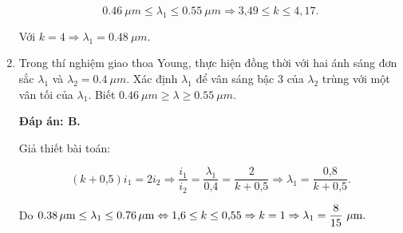 \begin{enumerate}[label=\bfseries Câu \arabic*:]
{		$$\SI{0,46}{\mu m} \leq \lambda_1 \leq \SI{0,55}{\mu m} \Rightarrow \text{3,49} \leq k \leq 4,17.$$
		
		Với $k = 4 \Rightarrow \lambda_1 = \SI{0,48}{\mu m}.$
	}
		\item {} 
	\cauhoi
	{Trong thí nghiệm giao thoa Young, thực hiện đồng thời với hai ánh sáng đơn sắc $\lambda_1$  và $\lambda_2 = \SI{0,4}{\mu m}$. Xác định $\lambda_1$ để vân sáng bậc 3 của $\lambda_2$ trùng với một vân tối của $\lambda_1$. Biết $\SI{0,46}{\mu m} \geq \lambda \geq \SI{0,55}{\mu m}.$
	}
	
	\loigiai
	{		\textbf{Đáp án: B.}
		
		Giả thiết bài toán:
		
		$$(k + \text{0,5})i_1 = 2i_2 \Rightarrow \dfrac{i_1}{i_2} = \dfrac{\lambda_1}{\text{0,4}} = \dfrac{2}{k + \text{0,5}} \Rightarrow \lambda_1 = \dfrac{\text{0,8}}{k+\text{0,5}}.$$
		
		Do $\SI{0,38}{\mu m} \leq \lambda_1 \leq \SI{0,76}{\mu m} \Leftrightarrow \text{1,6} \leq k \leq \text{0,55} \Rightarrow k = 1 \Rightarrow \lambda_1 = \dfrac{8}{15}\ \mu \text m.$
	}
\end{enumerate}

